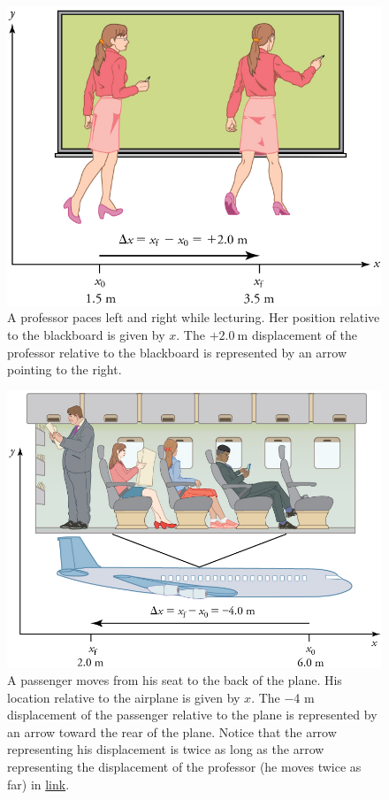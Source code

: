 \documentclass[
]{book}
\begin{document}
\begin{figure}
\hypertarget{import-auto-id2972079}{%
\centering
\includegraphics{images/Figure_02_01_01.jpg}
\caption{A professor paces left and right while lecturing. Her position
relative to the blackboard is given by \(x{}\). The
\({{+ 2}\text{.}0\ \text{m}}{}\) displacement of the professor relative to
the blackboard is represented by an arrow pointing to the
right.}\label{import-auto-id2972079}
}
\end{figure}

\begin{figure}
\hypertarget{import-auto-id2707699}{%
\centering
\includegraphics{images/Figure 02_01_02.jpg}
\caption{A passenger moves from his seat to the back of the plane. His location
relative to the airplane is given by \(x{}\). The −4 m displacement of the
passenger relative to the plane is represented by an arrow toward the
rear of the plane. Notice that the arrow representing his displacement
is twice as long as the arrow representing the displacement of the
professor (he moves twice as far) in
\protect\hyperlink{import-auto-id2972079}{link}.}\label{import-auto-id2707699}
}
\end{figure}
\end{document}
